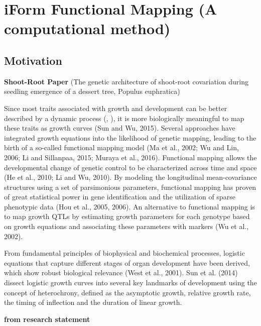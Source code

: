 \documentclass[]{book}
\theoremstyle{definition}
\theoremstyle{definition}
\theoremstyle{remark}
\begin{document}
\chapter{iForm Functional Mapping (A computational
method)}\label{iform-functional-mapping-a-computational-method}

\section{Motivation}\label{motivation-2}

\textbf{Shoot-Root Paper} (The genetic architecture of shoot-root
covariation during seedling emergence of a dessert tree, Populus
euphratica)

Since most traits associated with growth and development can be better
described by a dynamic process (\cite{hernandez2015understanding},
\cite{muraya2017genetic}), it is more biologically meaningful to map
these traits as growth curves (Sun and Wu, 2015). Several approaches
have integrated growth equations into the likelihood of genetic mapping,
leading to the birth of a so-called functional mapping model (Ma et al.,
2002; Wu and Lin, 2006; Li and Sillanpaa, 2015; Muraya et al., 2016).
Functional mapping allows the developmental change of genetic control to
be characterized across time and space (He et al., 2010; Li and Wu,
2010). By modeling the longitudinal mean-covariance structures using a
set of parsimonious parameters, functional mapping has proven of great
statistical power in gene identification and the utilization of sparse
phenotypic data (Hou et al., 2005, 2006). An alternative to functional
mapping is to map growth QTLs by estimating growth parameters for each
genotype based on growth equations and associating these parameters with
markers (Wu et al., 2002).

From fundamental principles of biophysical and biochemical processes,
logistic equations that capture different stages of organ development
have been derived, which show robust biological relevance (West et al.,
2001). Sun et al. (2014) dissect logistic growth curves into several key
landmarks of development using the concept of heterochrony, defined as
the asymptotic growth, relative growth rate, the timing of inflection
and the duration of linear growth.

\textbf{from research statement}
\end{document}
